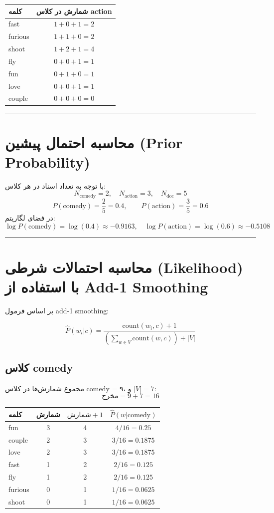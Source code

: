 \documentclass[11pt,a4paper]{article}
\newcommand{\en}[1]{\textenglish{#1}}
\newcommand{\separator}{\vspace{1em}\noindent\rule{\linewidth}{0.4pt}\vspace{1em}}
\begin{document}
\begin{center}
\begin{tabular}{|l|c|}
\hline
\textbf{کلمه} & \textbf{شمارش در کلاس \en{action}} \\
\hline
\en{fast} & $1 + 0 + 1 = 2$ \\
\hline
\en{furious} & $1 + 1 + 0 = 2$ \\
\hline
\en{shoot} & $1 + 2 + 1 = 4$ \\
\hline
\en{fly} & $0 + 0 + 1 = 1$ \\
\hline
\en{fun} & $0 + 1 + 0 = 1$ \\
\hline
\en{love} & $0 + 0 + 1 = 1$ \\
\hline
\en{couple} & $0 + 0 + 0 = 0$ \\
\hline
\end{tabular}
\end{center}

\separator
\section{محاسبه احتمال پیشین (\en{Prior Probability})}
با توجه به تعداد اسناد در هر کلاس:
\[
N_{\text{comedy}} = 2, \quad N_{\text{action}} = 3, \quad N_{\text{doc}} = 5
\]
\[
P(\text{comedy}) = \frac{2}{5} = 0.4, \qquad P(\text{action}) = \frac{3}{5} = 0.6
\]
در فضای لگاریتم:
\[
\log P(\text{comedy}) = \log(0.4) \approx -0.9163, \quad \log P(\text{action}) = \log(0.6) \approx -0.5108
\]

\separator
\section{محاسبه احتمالات شرطی (\en{Likelihood}) با استفاده از \en{Add-1 Smoothing}}
بر اساس فرمول \en{add-1 smoothing}:

\[
\hat{P}(w_i|c) = \frac{\text{count}(w_i,c) + 1}{\left(\sum_{w \in V} \text{count}(w,c)\right) + |V|}
\]

\subsection*{کلاس \en{comedy}}
مجموع شمارش‌ها در کلاس \en{comedy} = ۹، و $|V| = 7$:
\[
\text{مخرج} = 9 + 7 = 16
\]

\begin{center}
\begin{tabular}{|l|c|c|c|}
\hline
\textbf{کلمه} & \textbf{شمارش} & $\text{شمارش} + 1$ & $\hat{P}(w|\text{comedy})$ \\
\hline
\en{fun} & 3 & 4 & $4/16 = 0.25$ \\
\hline
\en{couple} & 2 & 3 & $3/16 = 0.1875$ \\
\hline
\en{love} & 2 & 3 & $3/16 = 0.1875$ \\
\hline
\en{fast} & 1 & 2 & $2/16 = 0.125$ \\
\hline
\en{fly} & 1 & 2 & $2/16 = 0.125$ \\
\hline
\en{furious} & 0 & 1 & $1/16 = 0.0625$ \\
\hline
\en{shoot} & 0 & 1 & $1/16 = 0.0625$ \\
\hline
\end{tabular}
\end{center}
\end{document}

